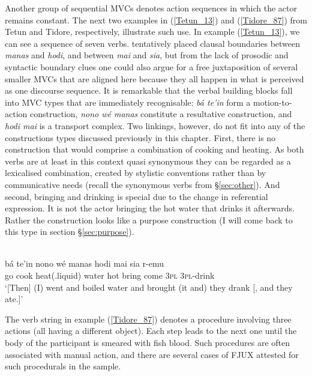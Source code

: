 Another group of sequential MVCs denotes action sequences in which the actor remains constant. The next two examples in (\ref{Tetun_13}) and (\ref{Tidore_87}) from Tetun and Tidore, respectively, illustrate such use. In example (\ref{Tetun_13}), we can see a sequence of seven verbs. \citet{vanklinken1999grammar} tentatively placed clausal boundaries between \textit{manas} and \textit{hodi}, and between \textit{mai} and \textit{sia}, but from the lack of prosodic and syntactic boundary clues one could also argue for a free juxtaposition of several smaller MVCs that are aligned here because they all happen in what is perceived as one discourse sequence. It is remarkable that the verbal building blocks fall into MVC types that are immediately recognisable: \textit{bá te'in} form a motion-to-action construction, \textit{nono wé manas} constitute a resultative construction, and \textit{hodi mai} is a transport complex. Two linkings, however, do not fit into any of the constructions types discussed previously in this chapter. First, there is no construction that would comprise a combination of cooking and heating. As both verbs are at least in this context quasi synonymous they can be regarded as a lexicalised combination, created by stylistic conventions rather than by communicative needs (recall the synonymous verbs from §\ref{sec:other}). And second, bringing and drinking is special due to the change in referential expression. It is not the actor bringing the hot water that drinks it afterwards. Rather the construction looks like a purpose construction (I will come back to this type in section §\ref{sec:purpose}). 

\ea \label{Tetun_13}
\\
\gll bá te'in nono wé manas hodi mai sia r-emu \\
go cook heat(.liquid) water hot bring come 3\textsc{pl} 3\textsc{pl}-drink \\
\glft `[Then] (I) went and boiled water and brought (it and) they drank [, and they ate.]'\\ 
\z

The verb string in example (\ref{Tidore_87}) denotes a procedure involving three actions (all having a different object). Each step leads to the next one until the body of the participant is smeared with fish blood. Such procedures are often associated with manual action, and there are several cases of FJUX attested for such procedurals in the sample.

